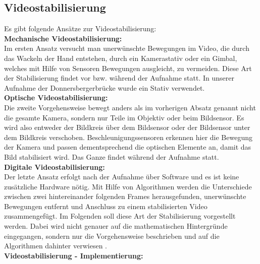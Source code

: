 \documentclass[conference]{IEEEtran}
\begin{document}
	\subsection{Videostabilisierung}
	Es gibt folgende Ansätze zur Videostabilisierung:\\
	\textbf{Mechanische Videostabilisierung:}\\
	Im ersten Ansatz versucht man unerwünschte Bewegungen im Video, die durch das Wackeln der Hand entstehen, durch ein Kamerastativ oder ein Gimbal, welches mit Hilfe von Sensoren Bewegungen ausgleicht, zu vermeiden. Diese Art der Stabilisierung findet vor bzw. während der Aufnahme statt.
	In unserer Aufnahme der Donnersbergerbrücke wurde ein Stativ verwendet.\\
	\textbf{Optische Videostabilisierung:}\\
	Die zweite Vorgehensweise bewegt anders als im vorherigen Absatz genannt nicht die gesamte Kamera, sondern nur Teile im Objektiv oder beim Bildsensor. Es wird also entweder der Bildkreis über dem Bildsensor oder der Bildsensor unter dem Bildkreis verschoben. Beschleunigungssensoren erkennen hier die Bewegung der Kamera und passen dementsprechend die optischen Elemente an, damit das Bild stabilisiert wird. Das Ganze findet während der Aufnahme statt.\\
	\textbf{Digitale Videostabilisierung:}\\
	Der letzte Ansatz erfolgt nach der Aufnahme über Software und es ist keine zusätzliche Hardware nötig. Mit Hilfe von Algorithmen werden die Unterschiede zwischen zwei hintereinander folgenden Frames herausgefunden, unerwünschte Bewegungen entfernt und Anschluss zu einem stabilisierten Video zusammengefügt. Im Folgenden soll diese Art der Stabilisierung vorgestellt werden.
	Dabei wird nicht genauer auf die mathematischen Hintergründe eingegangen, sondern nur die Vorgehensweise beschrieben und auf die Algorithmen dahinter verwiesen \cite{stab}.\\
	\textbf{Videostabilisierung - Implementierung:}
\end{document}

